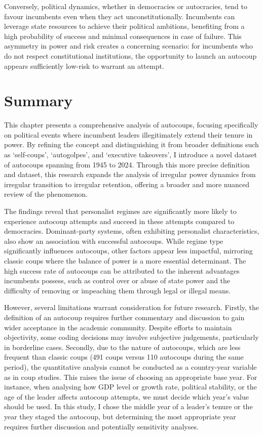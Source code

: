 \documentclass[
  12pt,
]{report}
\begin{document}
Conversely, political dynamics, whether in democracies or autocracies,
tend to favour incumbents even when they act unconstitutionally.
Incumbents can leverage state resources to achieve their political
ambitions, benefiting from a high probability of success and minimal
consequences in case of failure. This asymmetry in power and risk
creates a concerning scenario: for incumbents who do not respect
constitutional institutions, the opportunity to launch an autocoup
appears sufficiently low-risk to warrant an attempt.

\section{Summary}\label{summary-1}

This chapter presents a comprehensive analysis of autocoups, focusing
specifically on political events where incumbent leaders illegitimately
extend their tenure in power. By refining the concept and distinguishing
it from broader definitions such as `self-coups', `autogolpes', and
`executive takeovers', I introduce a novel dataset of autocoups spanning
from 1945 to 2024. Through this more precise definition and dataset,
this research expands the analysis of irregular power dynamics from
irregular transition to irregular retention, offering a broader and more
nuanced review of the phenomenon.

The findings reveal that personalist regimes are significantly more
likely to experience autocoup attempts and succeed in these attempts
compared to democracies. Dominant-party systems, often exhibiting
personalist characteristics, also show an association with successful
autocoups. While regime type significantly influences autocoups, other
factors appear less impactful, mirroring classic coups where the balance
of power is a more essential determinant. The high success rate of
autocoups can be attributed to the inherent advantages incumbents
possess, such as control over or abuse of state power and the difficulty
of removing or impeaching them through legal or illegal means.

However, several limitations warrant consideration for future research.
Firstly, the definition of an autocoup requires further commentary and
discussion to gain wider acceptance in the academic community. Despite
efforts to maintain objectivity, some coding decisions may involve
subjective judgements, particularly in borderline cases. Secondly, due
to the nature of autocoups, which are less frequent than classic coups
(491 coups versus 110 autocoups during the same period), the
quantitative analysis cannot be conducted as a country-year variable as
in coup studies. This raises the issue of choosing an appropriate base
year. For instance, when analysing how GDP level or growth rate,
political stability, or the age of the leader affects autocoup attempts,
we must decide which year's value should be used. In this study, I chose
the middle year of a leader's tenure or the year they staged the
autocoup, but determining the most appropriate year requires further
discussion and potentially sensitivity analyses.
\end{document}
